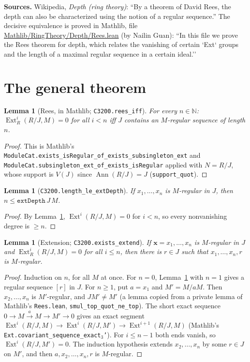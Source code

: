 \documentclass[11pt]{article}
\newtheorem{lemma}[theorem]{Lemma}
\theoremstyle{definition}
\newcommand{\Ext}{\operatorname{Ext}}
\begin{document}
\textbf{Sources.} Wikipedia, \emph{Depth (ring theory)}: ``By a theorem of David Rees, the depth can
also be characterized using the notion of a regular sequence.'' The decisive equivalence is proved in
Mathlib, file \url{Mathlib/RingTheory/Depth/Rees.lean} (by Nailin Guan): ``In this file we prove the
Rees theorem for depth, which relates the vanishing of certain `Ext` groups and the length of a
maximal regular sequence in a certain ideal.''

\section{The general theorem}

\begin{lemma}[Rees, in Mathlib; \texttt{C3200.rees\_iff}]\label{lem:rees}
For every $n\in\mathbb N$: $\Ext^i_R(R/J,M)=0$ for all $i<n$ iff $J$ contains an $M$-regular
sequence of length $n$.
\end{lemma}
\begin{proof}
This is Mathlib's \texttt{ModuleCat.exists\_isRegular\_of\_exists\_subsingleton\_ext} and
\texttt{ModuleCat.subsingleton\_ext\_of\_exists\_isRegular} applied with $N=R/J$, whose support is
$V(J)$ since $\operatorname{Ann}(R/J)=J$ (\texttt{support\_quot}).
\end{proof}

\begin{lemma}[\texttt{C3200.length\_le\_extDepth}]\label{lem:le}
If $x_1,\dots,x_n$ is $M$-regular in $J$, then $n\le\texttt{extDepth}\,J\,M$.
\end{lemma}
\begin{proof}
By Lemma~\ref{lem:rees}, $\Ext^i(R/J,M)=0$ for $i<n$, so every nonvanishing degree is $\ge n$.
\end{proof}

\begin{lemma}[Extension; \texttt{C3200.exists\_extend}]\label{lem:ext}
If $\mathbf x=x_1,\dots,x_n$ is $M$-regular in $J$ and $\Ext^i_R(R/J,M)=0$ for all $i\le n$, then
there is $r\in J$ such that $x_1,\dots,x_n,r$ is $M$-regular.
\end{lemma}
\begin{proof}
Induction on $n$, for all $M$ at once. For $n=0$, Lemma~\ref{lem:rees} with $n=1$ gives a regular
sequence $[r]$ in $J$. For $n\ge1$, put $a=x_1$ and $M'=M/aM$. Then $x_2,\dots,x_n$ is $M'$-regular,
and $JM'\neq M'$ (a lemma copied from a private lemma of Mathlib's \texttt{Rees.lean},
\texttt{smul\_top\_quot\_ne\_top}). The short exact sequence $0\to M\xrightarrow{a}M\to M'\to0$
gives an exact segment
$\Ext^i(R/J,M)\to\Ext^i(R/J,M')\to\Ext^{i+1}(R/J,M)$ (Mathlib's
\texttt{Ext.covariant\_sequence\_exact}$_3$\texttt{'}). For $i\le n-1$ both ends vanish, so
$\Ext^i(R/J,M')=0$. The induction hypothesis extends $x_2,\dots,x_n$ by some $r\in J$ on $M'$, and
then $a,x_2,\dots,x_n,r$ is $M$-regular.
\end{proof}
\end{document}

